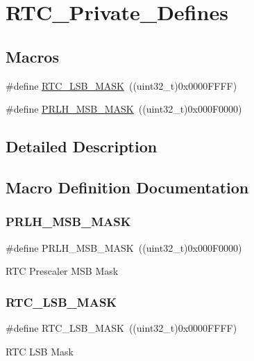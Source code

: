 \hypertarget{group___r_t_c___private___defines}{}\section{R\+T\+C\+\_\+\+Private\+\_\+\+Defines}
\label{group___r_t_c___private___defines}
\subsection*{Macros}
\begin{DoxyCompactItemize}
\item 
\#define \mbox{\hyperlink{group___r_t_c___private___defines_gae19d75bb0ecb5e93d97e026a04d4854f}{R\+T\+C\+\_\+\+L\+S\+B\+\_\+\+M\+A\+SK}}~((uint32\+\_\+t)0x0000\+F\+F\+F\+F)
\item 
\#define \mbox{\hyperlink{group___r_t_c___private___defines_ga47b3eed8e018a9139bc7bb374c7ca125}{P\+R\+L\+H\+\_\+\+M\+S\+B\+\_\+\+M\+A\+SK}}~((uint32\+\_\+t)0x000\+F0000)
\end{DoxyCompactItemize}


\subsection{Detailed Description}


\subsection{Macro Definition Documentation}
\mbox{\label{group___r_t_c___private___defines_ga47b3eed8e018a9139bc7bb374c7ca125}} 
\subsubsection{\texorpdfstring{PRLH\_MSB\_MASK}{PRLH\_MSB\_MASK}}
{\footnotesize\ttfamily \#define P\+R\+L\+H\+\_\+\+M\+S\+B\+\_\+\+M\+A\+SK~((uint32\+\_\+t)0x000\+F0000)}

R\+TC Prescaler M\+SB Mask \mbox{\label{group___r_t_c___private___defines_gae19d75bb0ecb5e93d97e026a04d4854f}} 
\subsubsection{\texorpdfstring{RTC\_LSB\_MASK}{RTC\_LSB\_MASK}}
{\footnotesize\ttfamily \#define R\+T\+C\+\_\+\+L\+S\+B\+\_\+\+M\+A\+SK~((uint32\+\_\+t)0x0000\+F\+F\+F\+F)}

R\+TC L\+SB Mask 